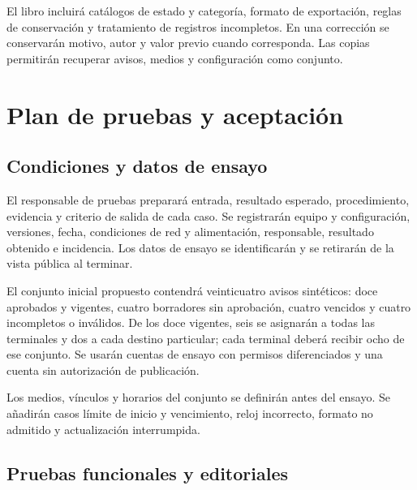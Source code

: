 El libro incluirá catálogos de estado y categoría, formato de exportación, reglas de conservación y tratamiento de registros incompletos. En una corrección se conservarán motivo, autor y valor previo cuando corresponda. Las copias permitirán recuperar avisos, medios y configuración como conjunto.

\section{Plan de pruebas y aceptación}
\label{sec:int_pruebas}
\subsection{Condiciones y datos de ensayo}
El responsable de pruebas preparará entrada, resultado esperado, procedimiento, evidencia y criterio de salida de cada caso. Se registrarán equipo y configuración, versiones, fecha, condiciones de red y alimentación, responsable, resultado obtenido e incidencia. Los datos de ensayo se identificarán y se retirarán de la vista pública al terminar.

El conjunto inicial propuesto contendrá veinticuatro avisos sintéticos: doce aprobados y vigentes, cuatro borradores sin aprobación, cuatro vencidos y cuatro incompletos o inválidos. De los doce vigentes, seis se asignarán a todas las terminales y dos a cada destino particular; cada terminal deberá recibir ocho de ese conjunto. Se usarán cuentas de ensayo con permisos diferenciados y una cuenta sin autorización de publicación.

Los medios, vínculos y horarios del conjunto se definirán antes del ensayo. Se añadirán casos límite de inicio y vencimiento, reloj incorrecto, formato no admitido y actualización interrumpida.

\subsection{Pruebas funcionales y editoriales}

